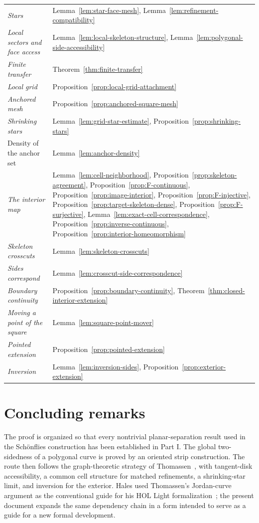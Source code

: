 \documentclass[11pt]{article}
\theoremstyle{mainplain}
\theoremstyle{mainroman}
\theoremstyle{definition}
\numberwithin{equation}{section}
\begin{document}
\begin{longtable}{@{}p{}p{}@{}}
\emph{Stars} & Lemma~\ref{lem:star-face-mesh}, Lemma~\ref{lem:refinement-compatibility} \\
\emph{Local sectors and face access} & Lemma~\ref{lem:local-skeleton-structure}, Lemma~\ref{lem:polygonal-side-accessibility} \\
\emph{Finite transfer} & Theorem~\ref{thm:finite-transfer} \\
\emph{Local grid} & Proposition~\ref{prop:local-grid-attachment} \\
\emph{Anchored mesh} & Proposition~\ref{prop:anchored-square-mesh} \\
\emph{Shrinking stars} & Lemma~\ref{lem:grid-star-estimate}, Proposition~\ref{prop:shrinking-stars} \\
Density of the anchor set & Lemma~\ref{lem:anchor-density} \\
\emph{The interior map} & Lemma~\ref{lem:cell-neighborhood}, Proposition~\ref{prop:skeleton-agreement}, Proposition~\ref{prop:F-continuous}, Proposition~\ref{prop:image-interior}, Proposition~\ref{prop:F-injective}, Proposition~\ref{prop:target-skeleton-dense}, Proposition~\ref{prop:F-surjective}, Lemma~\ref{lem:exact-cell-correspondence}, Proposition~\ref{prop:inverse-continuous}, Proposition~\ref{prop:interior-homeomorphism} \\
\emph{Skeleton crosscuts} & Lemma~\ref{lem:skeleton-crosscuts} \\
\emph{Sides correspond} & Lemma~\ref{lem:crosscut-side-correspondence} \\
\emph{Boundary continuity} & Proposition~\ref{prop:boundary-continuity}, Theorem~\ref{thm:closed-interior-extension} \\
\emph{Moving a point of the square} & Lemma~\ref{lem:square-point-mover} \\
\emph{Pointed extension} & Proposition~\ref{prop:pointed-extension} \\
\emph{Inversion} & Lemma~\ref{lem:inversion-sides}, Proposition~\ref{prop:exterior-extension} \\
\end{longtable}

\section*{Concluding remarks}
The proof is organized so that every nontrivial planar-separation result used in the Schönflies construction has been established in Part I. The global two-sidedness of a polygonal curve is proved by an oriented strip construction. The route then follows the graph-theoretic strategy of Thomassen~\cite{Thomassen}, with tangent-disk accessibility, a common cell structure for matched refinements, a shrinking-star limit, and inversion for the exterior. Hales used Thomassen's Jordan-curve argument as the conventional guide for his HOL Light formalization~\cite{Hales}; the present document expands the same dependency chain in a form intended to serve as a guide for a new formal development.
\end{document}
